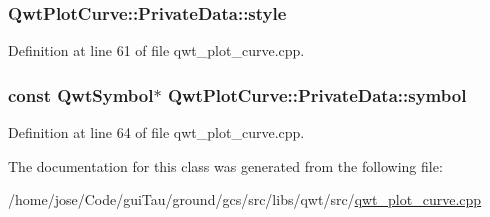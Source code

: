 \hypertarget{class_qwt_plot_curve_1_1_private_data_a1df7767ced8269a581bb2923d084ace9}{
\subsubsection[{style}]{ Qwt\-Plot\-Curve\-::\-Private\-Data\-::style}}\label{class_qwt_plot_curve_1_1_private_data_a1df7767ced8269a581bb2923d084ace9}


Definition at line 61 of file qwt\-\_\-plot\-\_\-curve.\-cpp.

\hypertarget{class_qwt_plot_curve_1_1_private_data_a5f0ec10ec239b40261c10ad6159688c3}{
\subsubsection[{symbol}]{\setlength{\rightskip}{0pt plus 5cm}const {\bf Qwt\-Symbol}$\ast$ Qwt\-Plot\-Curve\-::\-Private\-Data\-::symbol}}\label{class_qwt_plot_curve_1_1_private_data_a5f0ec10ec239b40261c10ad6159688c3}


Definition at line 64 of file qwt\-\_\-plot\-\_\-curve.\-cpp.



The documentation for this class was generated from the following file\-:\begin{DoxyCompactItemize}
\item 
/home/jose/\-Code/gui\-Tau/ground/gcs/src/libs/qwt/src/\hyperlink{qwt__plot__curve_8cpp}{qwt\-\_\-plot\-\_\-curve.\-cpp}\end{DoxyCompactItemize}
